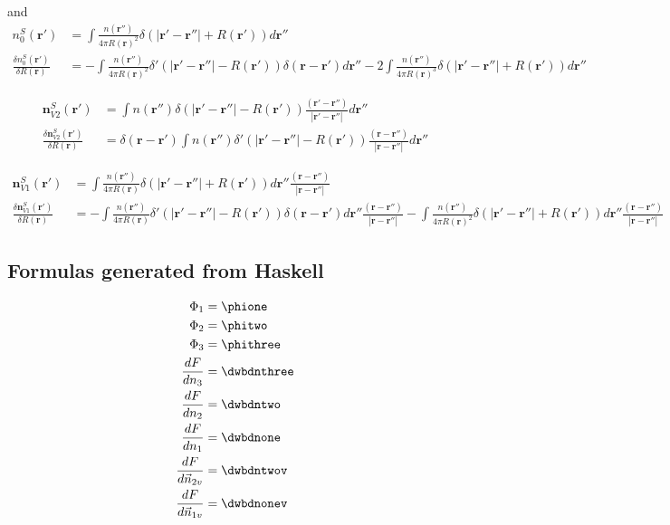 \documentclass[letterpaper,twocolumn,amsmath,amssymb,jcp,10pt,aip]{revtex4-1}
\begin{document}
\begin{widetext}
and 
\begin{align}
  n_0^{S}(\mathbf{r}') &= \int \frac{n(\mathbf{r}'')}{4\pi R(\mathbf{r})^2} \delta(|\mathbf{r}' - \mathbf{r}''| + R(\mathbf{r}'))d\mathbf r''\\
    \frac{\delta n_0^{S}(\mathbf{r}')}{\delta R(\mathbf{r})} &= -\int \frac{n(\mathbf{r}'')}{4\pi R(\mathbf{r})^2} 
  \delta'(|\mathbf{r}'-\mathbf{r}''| - R(\mathbf{r}')) \delta(\mathbf{r}-\mathbf{r}') d\mathbf{r}'' 
  -
  2\int \frac{n(\mathbf{r}'')}{4\pi R(\mathbf{r})^3} \delta(|\mathbf{r}' - \mathbf{r}''| + R(\mathbf{r}'))d\mathbf r''
\end{align}

\begin{align}
  \mathbf{n}_{V2}^{S}(\mathbf{r}') &= \int n(\mathbf{r}'') \delta(|\mathbf{r}' - \mathbf{r}''| - R(\mathbf{r}'))
  \frac{(\mathbf{r}' - \mathbf{r}'')}{|\mathbf{r}' - \mathbf{r}''|} d \mathbf{r}''\\
  \frac{\delta \mathbf{n}_{V2}^{S}(\mathbf{r}')}{\delta R(\mathbf{r})} &= \delta(\mathbf{r} - \mathbf{r}')
  \int n(\mathbf{r}'') \delta'(|\mathbf{r}' - \mathbf{r}''| - R(\mathbf{r}')) 
  \frac{(\mathbf{r} - \mathbf{r}'')}{|\mathbf{r} - \mathbf{r}''|} d\mathbf{r}''
\end{align}

\begin{align}
 \mathbf{n}_{V1}^{S}(\mathbf{r}') &= \int \frac{n(\mathbf{r}'')}{4\pi R(\mathbf{r})} \delta(|\mathbf{r}' - \mathbf{r}''| + R(\mathbf{r}'))d\mathbf r''
   \frac{(\mathbf{r} - \mathbf{r}'')}{|\mathbf{r} - \mathbf{r}''|}\\
 \frac{\delta \mathbf{n}_{V1}^{S}(\mathbf{r}')}{\delta R(\mathbf{r})} &= -\int \frac{n(\mathbf{r}'')}{4\pi R(\mathbf{r})} 
   \delta'(|\mathbf{r}'-\mathbf{r}''| - R(\mathbf{r}')) \delta(\mathbf{r}-\mathbf{r}') d\mathbf{r}'' \frac{(\mathbf{r} - \mathbf{r}'')}{|\mathbf{r} - \mathbf{r}''|} 
   -
   \int \frac{n(\mathbf{r}'')}{4\pi R(\mathbf{r})^2} \delta(|\mathbf{r}' - \mathbf{r}''| + R(\mathbf{r}'))d\mathbf r'' 
   \frac{(\mathbf{r} - \mathbf{r}'')}{|\mathbf{r} - \mathbf{r}''|}
\end{align}





\begin{widetext}
\section{Formulas generated from Haskell}


\begin{align}
  \Phi_1 &= \phione \\
  \Phi_2 &= \phitwo \\
  \Phi_3 &= \phithree \\
  \frac{d F}{dn_3} &= \dwbdnthree \\
  \frac{d F}{dn_2} &= \dwbdntwo \\
  \frac{d F}{dn_1} &= \dwbdnone \\
  \frac{d F}{d\vec{n}_{2v}} &= \dwbdntwov \\
  \frac{d F}{d\vec{n}_{1v}} &= \dwbdnonev
\end{align}




\end{widetext}
\end{widetext}
\end{document}
